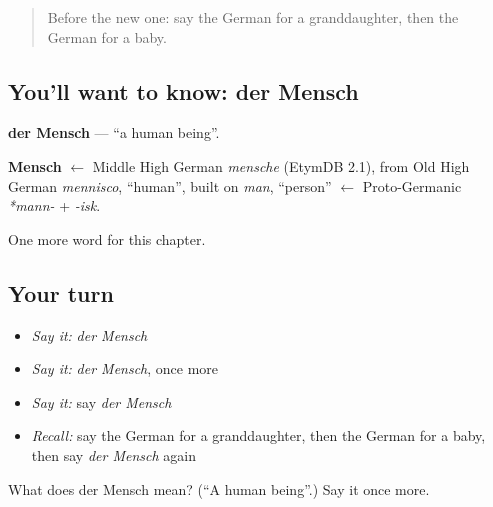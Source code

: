 \label{lesson:GE-C164-mensch}



\begin{quote}
Before the new one: say the German for a granddaughter, then the German for a baby.
\end{quote}

\subsection*{You'll want to know: der Mensch}
\textbf{der Mensch} — \textquotedblleft{}a human being\textquotedblright{}.

\begin{cousinweb}
\textbf{Mensch} $\leftarrow$ Middle High German \emph{mensche} (EtymDB 2.1), from Old High German \emph{mennisco}, \textquotedblleft{}human\textquotedblright{}, built on \emph{man}, \textquotedblleft{}person\textquotedblright{} $\leftarrow$ Proto-Germanic \emph{*mann-} + \emph{-isk}.
\end{cousinweb}

\begin{grammarlens}[title={What you've built}]
One more word for this chapter.
\end{grammarlens}

\subsection*{Your turn}
\begin{itemize}
\raggedright
  \item \emph{Say it:} \emph{der Mensch}
  \item \emph{Say it:} \emph{der Mensch}, once more
  \item \emph{Say it:} say \emph{der Mensch}
  \item \emph{Recall:} say the German for a granddaughter, then the German for a baby, then say \emph{der Mensch} again
\end{itemize}

\begin{tcolorbox}[breakable,colback=teal!4,colframe=teal!35!black,title={Before you move on}]
What does der Mensch mean? (\textquotedblleft{}A human being\textquotedblright{}.) Say it once more.
\end{tcolorbox}
